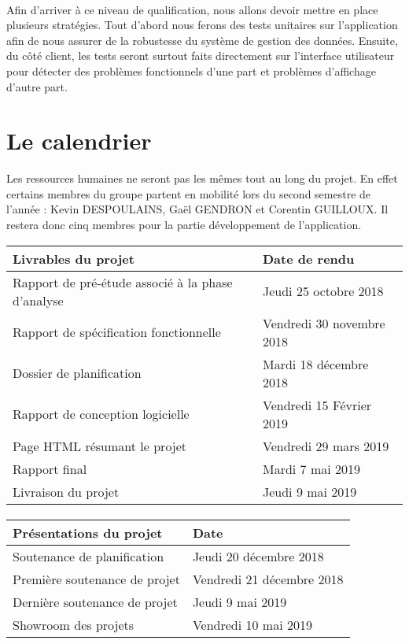 \paragraph{}

Afin d’arriver à ce niveau de qualification, nous allons devoir mettre en place plusieurs  stratégies. Tout d’abord nous ferons des tests unitaires sur l’application afin de nous assurer de la robustesse du système de gestion des données. Ensuite, du côté client, les tests seront surtout faits directement sur l’interface utilisateur pour détecter des problèmes fonctionnels d’une part et problèmes d’affichage d’autre part.

\section{Le calendrier}

Les ressources humaines ne seront pas les mêmes tout au long du projet. En effet certains membres du groupe partent en mobilité lors du second semestre de l’année : Kevin DESPOULAINS, Gaël GENDRON et Corentin GUILLOUX. Il restera donc cinq membres pour la partie développement de l’application.

\begin{center}

\begin{tabular}{ | l | l | }
	\hline
	\textbf{Livrables du projet} & \textbf{Date de rendu} \\
	\hline
	Rapport de pré-étude associé à la phase d'analyse & Jeudi 25 octobre 2018 \\
	\hline
	Rapport de spécification fonctionnelle  & Vendredi 30 novembre 2018 \\
	\hline
	Dossier de planification & Mardi 18 décembre 2018 \\
	\hline
	Rapport de conception logicielle & Vendredi 15 Février 2019 \\
	\hline
	Page HTML résumant le projet & Vendredi 29 mars 2019 \\
	\hline
	Rapport final  & Mardi 7 mai 2019 \\
	\hline
	Livraison du projet & Jeudi 9 mai 2019 \\
	\hline
\end{tabular}

\paragraph{}

\begin{tabular}{ | l | l | }
	\hline
	\textbf{Présentations du projet} & \textbf{Date} \\
	\hline
	Soutenance de planification  & Jeudi 20 décembre 2018 \\
	\hline
	Première soutenance de projet  & Vendredi 21 décembre 2018 \\
	\hline
	Dernière soutenance de projet & Jeudi 9 mai 2019 \\
	\hline
	Showroom des projets & Vendredi 10 mai 2019 \\
\end{tabular}

\end{center}

